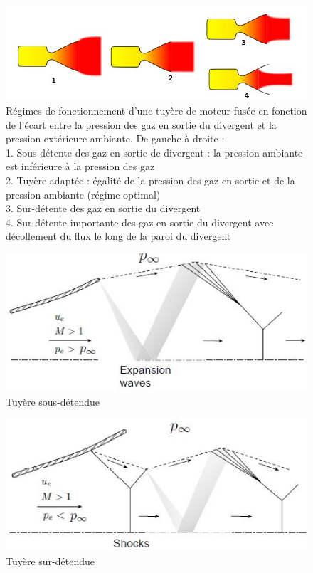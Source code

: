 \documentclass{report}
\begin{document}
\begin{figure}[h!]
    \centering
    \includegraphics[scale=0.7]{44.JPG}
    \caption{Régimes de fonctionnement d'une tuyère de moteur-fusée en fonction de l'écart entre la pression des gaz en sortie du divergent et la pression extérieure ambiante. De gauche à droite :\\
1. Sous-détente des gaz en sortie de divergent : la pression ambiante est inférieure à la pression des gaz\\
2. Tuyère adaptée : égalité de la pression des gaz en sortie et de la pression ambiante (régime optimal)\\
3. Sur-détente des gaz en sortie du divergent\\
4. Sur-détente importante des gaz en sortie du divergent avec décollement du flux le long de la paroi du divergent}
    \label{44}
\end{figure}

\begin{figure}[h!]
    \centering
    \includegraphics[scale=0.7]{45.JPG}
    \caption{Tuyère sous-détendue}
    \label{45}
\end{figure}
\begin{figure}[h!]
    \centering
    \includegraphics[scale=0.7]{46.JPG}
    \caption{Tuyère sur-détendue}
    \label{46}
\end{figure}
\end{document}
